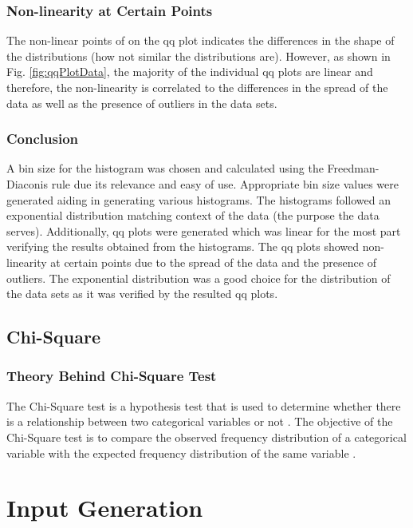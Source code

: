 \documentclass[final, hidelinks, 12pt, a4paper]{article}
\begin{document}
    \subsubsection{Non-linearity at Certain Points}
    \label{sssct:nonLinPoints}
    The non-linear points of on the \gls{qq} plot indicates the differences in the shape of the distributions (how not similar the distributions are).
    However, as shown in Fig. \ref{fig:qqPlotData}, the majority of the individual \gls{qq} plots are linear and therefore, the non-linearity is correlated to the differences in the spread of the data as well as the presence of outliers in the data sets.
    \subsubsection{Conclusion}
    \label{sssct:qqConclusion}
    A bin size for the histogram was chosen and calculated using the Freedman-Diaconis rule due its relevance and easy of use.
    Appropriate bin size values were generated aiding in generating various histograms.
    The histograms followed an exponential distribution matching context of the data (the purpose the data serves).
    Additionally, \gls{qq} plots were generated which was linear for the most part verifying the results obtained from the histograms.
    The \gls{qq} plots showed non-linearity at certain points due to the spread of the data and the presence of outliers.
    The exponential distribution was a good choice for the distribution of the data sets as it was verified by the resulted \gls{qq} plots.
    \clearpage
    \subsection{Chi-Square}
    \label{sct:chiSquare}
    \subsubsection{Theory Behind Chi-Square Test}
    \label{sssct:theoryChiSq}
    The Chi-Square test is a hypothesis test that is used to determine whether there is a relationship between two categorical variables or not \cite{acc:chiTh}.
The objective of the Chi-Square test is to compare the observed frequency distribution of a categorical variable with the expected frequency distribution of the same variable \cite{acc:chiTh}.
    \clearpage
    \section{Input Generation}
    \label{sct:inputGen}
\end{document}

